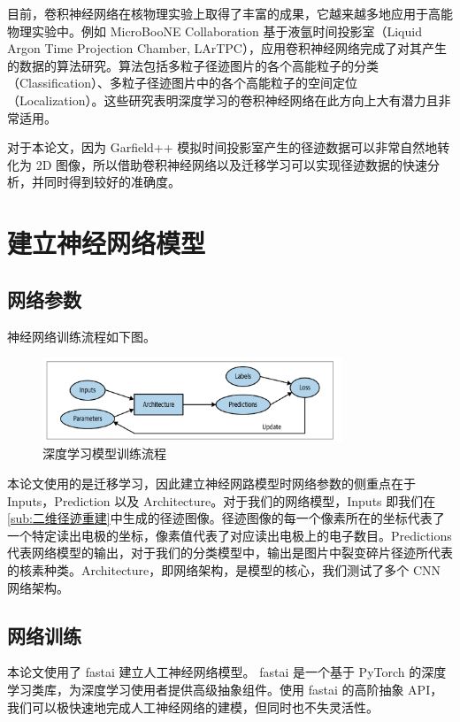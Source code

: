 \documentclass[AutoFakeBold]{LZUThesis}
\begin{document}
目前，卷积神经网络在核物理实验上取得了丰富的成果，它越来越多地应用于高能物理实验中\cite{radovic2018machine, abratenko2020convolutional, abi2020neutrino, acciarri2017convolutional, racah2016revealing, aurisano2016convolutional, renner2017background}。例如 MicroBooNE Collaboration 基于液氩时间投影室（Liquid Argon Time Projection Chamber, LArTPC），应用卷积神经网络完成了对其产生的数据的算法研究。算法包括多粒子径迹图片的各个高能粒子的分类（Classification）、多粒子径迹图片中的各个高能粒子的空间定位（Localization）\cite{abratenko2020convolutional}。这些研究表明深度学习的卷积神经网络在此方向上大有潜力且非常适用。

对于本论文，因为 Garfield++ 模拟时间投影室产生的径迹数据可以非常自然地转化为 2D 图像，所以借助卷积神经网络以及迁移学习可以实现径迹数据的快速分析，并同时得到较好的准确度。




\section{建立神经网络模型}
\subsection{网络参数}
神经网络训练流程如下图。

\begin{figure}[H]
    \centering
    \includegraphics[width=0.8\textwidth]{figures/deep-learning.png}
    \caption{深度学习模型训练流程}
    \label{fig_deep-learning}
\end{figure}


本论文使用的是迁移学习，因此建立神经网路模型时网络参数的侧重点在于 Inputs，Prediction 以及 Architecture。对于我们的网络模型，Inputs 即我们在 \ref{sub:二维径迹重建}中生成的径迹图像。径迹图像的每一个像素所在的坐标代表了一个特定读出电极的坐标，像素值代表了对应读出电极上的电子数目。Predictions 代表网络模型的输出，对于我们的分类模型中，输出是图片中裂变碎片径迹所代表的核素种类。Architecture，即网络架构，是模型的核心，我们测试了多个 CNN 网络架构。


\subsection{网络训练}
本论文使用了 fastai\cite{howard2020fastai} 建立人工神经网络模型。
fastai 是一个基于 PyTorch 的深度学习类库，为深度学习使用者提供高级抽象组件。使用 fastai 的高阶抽象 API，我们可以极快速地完成人工神经网络的建模，但同时也不失灵活性。
\end{document}
